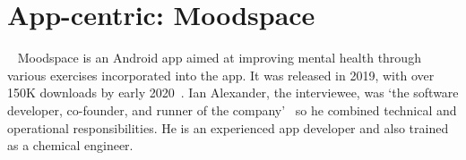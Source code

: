 \section{App-centric: Moodspace}~\label{case-study-overview-moodspace} %
Moodspace is an Android app aimed at improving mental health through various exercises incorporated into the app. %
It was released in 2019, with over 150K downloads by early 2020~. Ian Alexander, the interviewee, was `the software developer, co-founder, and runner of the company'~ so he combined technical and operational responsibilities. He is an experienced app developer and also trained as a chemical engineer.

